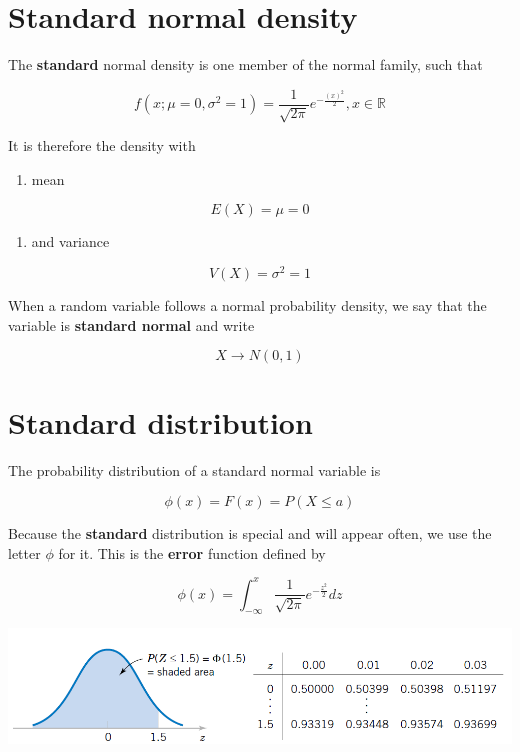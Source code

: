 \documentclass[
]{book}
\providecommand{\tightlist}{%
  \setlength{\itemsep}{0pt}\setlength{\parskip}{0pt}}
\begin{document}
\hypertarget{standard-normal-density}{%
\section{Standard normal density}\label{standard-normal-density}}

The \textbf{standard} normal density is one member of the normal family, such that

\[f(x; \mu=0, \sigma^2=1)=\frac{1}{\sqrt{2\pi}}e^{-\frac{(x)^2}{2}}, x \in {\mathbb R}\]

It is therefore the density with

\begin{enumerate}
\def\labelenumi{\arabic{enumi})}
\tightlist
\item
  mean
\end{enumerate}

\[E (X)= \mu = 0\]

\begin{enumerate}
\def\labelenumi{\arabic{enumi})}
\setcounter{enumi}{1}
\tightlist
\item
  and variance
\end{enumerate}

\[V (X)=  \sigma^2 =1\]

When a random variable follows a normal probability density, we say that the variable is \textbf{standard normal} and write

\[X \rightarrow N(0,1)\]

\hypertarget{standard-distribution}{%
\section{Standard distribution}\label{standard-distribution}}

The probability distribution of a standard normal variable is

\[\phi(x)=F(x)=P(X \leq a)\]

Because the \textbf{standard} distribution is special and will appear often, we use the letter \(\phi\) for it. This is the \textbf{error} function defined by

\[\phi(x)=\int_{-\infty}^{x} \frac{1}{\sqrt{2\pi}}e^{-\frac{z^2}{2}} dz\]

\includegraphics{./figures/st.png}
\end{document}
